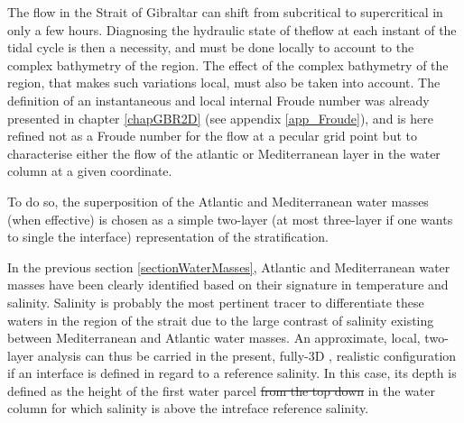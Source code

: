 
The flow in the Strait of Gibraltar can shift from subcritical to supercritical in only a few hours. Diagnosing the hydraulic state of theflow at each instant of the tidal cycle is then a necessity, and must be done locally to account to the complex bathymetry of the region. The effect of the complex bathymetry of the region, that makes such variations local, must also be taken into account. The definition of an instantaneous and local internal Froude number was already presented in chapter \ref{chapGBR2D} (see appendix \ref{app_Froude}), and is here refined not as a Froude number for the flow at a pecular grid point but to characterise either the flow of the atlantic or Mediterranean layer in the water column at a given coordinate.



To do so,  the superposition of the Atlantic and Mediterranean water masses (when effective) is chosen as a simple two-layer (at most three-layer if one wants to single the interface) representation of the stratification.

In the previous section \ref{sectionWaterMasses}, Atlantic and Mediterranean water masses have been clearly identified based on their signature in temperature and salinity. Salinity is probably the most pertinent tracer to differentiate these waters in the region of the strait due to the large contrast of salinity existing between Mediterranean and Atlantic water masses.
An approximate, local, two-layer analysis can thus be carried in the present, fully-3D , realistic configuration if an interface is defined in regard to a reference salinity. In this case, its depth is defined as the height of the first water parcel \sout{from the top down} in the water column for which salinity is above the intreface reference salinity.

